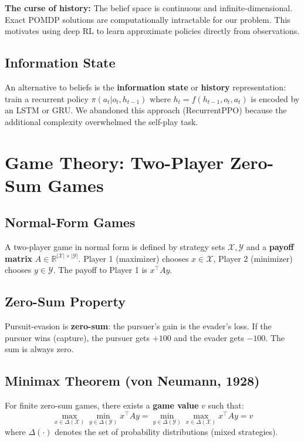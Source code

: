 \documentclass[11pt,a4paper]{report}
\begin{document}
\begin{warningbox}
\textbf{The curse of history:} The belief space is continuous and infinite-dimensional. Exact POMDP solutions are computationally intractable for our problem. This motivates using deep RL to learn approximate policies directly from observations.
\end{warningbox}

\subsection{Information State}

An alternative to beliefs is the \textbf{information state} or \textbf{history} representation: train a recurrent policy $\pi(a_t | o_t, h_{t-1})$ where $h_t = f(h_{t-1}, o_t, a_t)$ is encoded by an LSTM or GRU. We abandoned this approach (RecurrentPPO) because the additional complexity overwhelmed the self-play task.

\section{Game Theory: Two-Player Zero-Sum Games}

\subsection{Normal-Form Games}

A two-player game in normal form is defined by strategy sets $\mathcal{X}, \mathcal{Y}$ and a \textbf{payoff matrix} $A \in \mathbb{R}^{|\mathcal{X}| \times |\mathcal{Y}|}$. Player 1 (maximizer) chooses $x \in \mathcal{X}$, Player 2 (minimizer) chooses $y \in \mathcal{Y}$. The payoff to Player 1 is $x^\top A y$.

\subsection{Zero-Sum Property}

Pursuit-evasion is \textbf{zero-sum}: the pursuer's gain is the evader's loss. If the pursuer wins (capture), the pursuer gets $+100$ and the evader gets $-100$. The sum is always zero.

\subsection{Minimax Theorem (von Neumann, 1928)}

For finite zero-sum games, there exists a \textbf{game value} $v$ such that:
\begin{equation}
    \max_{x \in \Delta(\mathcal{X})} \min_{y \in \Delta(\mathcal{Y})} x^\top A y = \min_{y \in \Delta(\mathcal{Y})} \max_{x \in \Delta(\mathcal{X})} x^\top A y = v
\end{equation}
where $\Delta(\cdot)$ denotes the set of probability distributions (mixed strategies).
\end{document}
